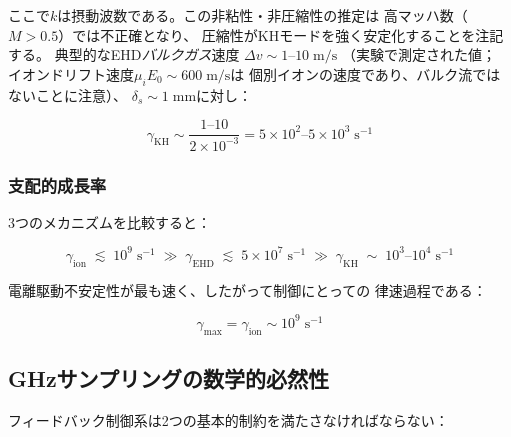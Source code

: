 \documentclass[12pt,twocolumn]{ltjsarticle}
\begin{document}
ここで$k$は摂動波数である。この非粘性・非圧縮性の推定は
高マッハ数（$M > 0.5$）では不正確となり、
圧縮性がKHモードを強く安定化することを注記する。
典型的なEHD\emph{バルクガス}速度
$\Delta v \sim 1$--$10\;\mathrm{m/s}$
（実験\cite{Xu2018, Moreau2007}で測定された値；
イオンドリフト速度$\mu_i E_0 \sim 600\;\mathrm{m/s}$は
個別イオンの速度であり、バルク流ではないことに注意）、
$\delta_s \sim 1\;\mathrm{mm}$に対し：

\begin{equation}
  \gamma_{\mathrm{KH}}
  \sim \frac{1\text{--}10}{2 \times 10^{-3}}
  = 5 \times 10^2\text{--}5 \times 10^3\;\mathrm{s^{-1}}
  \label{eq:gamma_KH_num}
\end{equation}

\subsubsection{支配的成長率}

3つのメカニズムを比較すると：

\begin{equation}
  \gamma_{\mathrm{ion}} \;\lesssim\; 10^{9}\;\mathrm{s^{-1}}
  \;\gg\; \gamma_{\mathrm{EHD}} \;\lesssim\; 5 \times 10^{7}\;\mathrm{s^{-1}}
  \;\gg\; \gamma_{\mathrm{KH}} \;\sim\; 10^{3}\text{--}10^{4}\;\mathrm{s^{-1}}
  \label{eq:gamma_hierarchy}
\end{equation}

電離駆動不安定性が最も速く、したがって制御にとっての
律速過程である：

\begin{equation}
\boxed{
  \gamma_{\max}
  = \gamma_{\mathrm{ion}}
  \sim 10^{9}\;\mathrm{s^{-1}}
}
\label{eq:gamma_max}
\end{equation}

\subsection{GHzサンプリングの数学的必然性}
\label{sec:stability:nyquist}

フィードバック制御系は2つの基本的制約を満たさなければならない：
\end{document}
